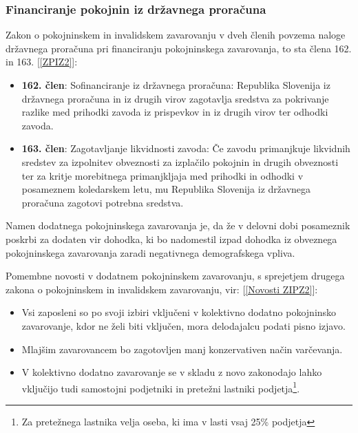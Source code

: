 \documentclass[12pt, a4paper]{article}
\begin{document}
\subsubsection[Financiranje pokojnin iz državnega proračuna]{Financiranje pokojnin iz državnega proračuna}

Zakon o pokojninskem in invalidskem zavarovanju v dveh členih povzema naloge državnega proračuna pri financiranju pokojninskega zavarovanja, to sta člena 162. in 163. [\ref{ZPIZ2}]:
\begin{itemize}
	\item \textbf{162. člen}: Sofinanciranje iz državnega proračuna: Republika Slovenija iz državnega proračuna in iz drugih virov zagotavlja sredstva za pokrivanje razlike med prihodki zavoda iz prispevkov in iz drugih virov ter odhodki zavoda.
	\item \textbf{163. člen}: Zagotavljanje likvidnosti zavoda: Če zavodu primanjkuje likvidnih sredstev za izpolnitev obveznosti za izplačilo pokojnin in drugih obveznosti ter za kritje morebitnega primanjkljaja med prihodki in odhodki v posameznem koledarskem letu, mu Republika Slovenija iz državnega proračuna zagotovi potrebna sredstva.
\end{itemize}

Namen dodatnega pokojninskega zavarovanja je, da že v delovni dobi posameznik poskrbi za dodaten vir dohodka, ki bo nadomestil izpad dohodka iz obveznega pokojninskega zavarovanja zaradi negativnega demografskega vpliva.

Pomembne novosti v dodatnem pokojninskem zavarovanju, s sprejetjem drugega zakona o  pokojninskem in invalidskem zavarovanju, vir: [\ref{Novosti ZIPZ2}]:
\begin{itemize}
	\item Vsi zaposleni so po svoji izbiri vključeni v kolektivno dodatno pokojninsko zavarovanje, kdor ne želi biti vključen, mora delodajalcu podati pisno izjavo.
	\item Mlajšim zavarovancem bo zagotovljen manj konzervativen način varčevanja.
	\item V kolektivno dodatno zavarovanje se v skladu z novo zakonodajo lahko vključijo tudi samostojni podjetniki in pretežni lastniki podjetja\footnote{Za pretežnega lastnika velja oseba, ki ima v lasti vsaj 25\% podjetja}.
\end{itemize}
\end{document}
